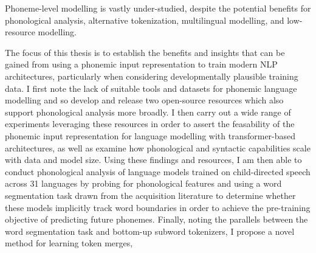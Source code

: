 Phoneme-level modelling is vastly under-studied, despite the potential benefits for phonological analysis, alternative tokenization, multilingual modelling, and low-resource modelling. 

The focus of this thesis is to establish the benefits and insights that can be gained from using a phonemic input representation to train modern NLP architectures, particularly when considering developmentally plausible training data. I first note the lack of suitable tools and datasets for phonemic language modelling and so develop and release two open-source resources which also support phonological analysis more broadly. I then carry out a wide range of experiments leveraging these resources in order to assert the feasability of the phonemic input representation for language modelling with transformer-based architectures, as well as examine how phonological and syntactic capabilities scale with data and model size. Using these findings and resources, I am then able to conduct phonological analysis of language models trained on child-directed speech across 31 languages by probing for phonological features and using a word segmentation task drawn from the acquisition literature to determine whether these models implicitly track word boundaries in order to achieve the pre-training objective of predicting future phonemes. Finally, noting the parallels between the word segmentation task and bottom-up subword tokenizers, I propose a novel method for learning token merges, 













